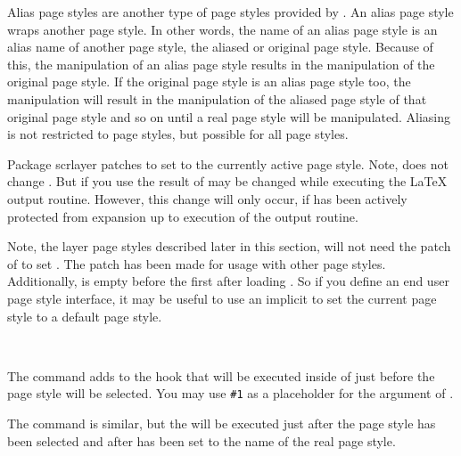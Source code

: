 Alias page styles are another type of page styles provided by
. An alias page style wraps another page style. In other
words, the name of an alias page style is an alias name of another page style,
the aliased or original page style. Because of this, the manipulation of an
alias page style results in the manipulation of the original page style. If
the original page style is an alias page style too, the manipulation will
result in the manipulation of the aliased page style of that original page
style and so on until a real page style will be manipulated. Aliasing is not
restricted to  page styles, but possible for all page
styles.

\begin{Declaration}
\end{Declaration}
%
Package scrlayer patches  to set  to
the currently active page style. Note,  does not change
. But if you use  the result of
 may be changed while executing the \LaTeX{} output
routine. However, this change will only occur, if  has
been actively protected from expansion up to execution of the output routine.

Note, the layer page styles described later in this section, will not need
the patch of  to set . The patch has
been made for usage with other page styles. Additionally, 
 is empty before the first  after
loading . So if you define an end user page style interface,
it may be useful to use an implicit  to set the current page
style to a default page style.%

\begin{Declaration}
  \\
\end{Declaration}
%
%
The command  adds  to the hook
that will be executed inside of  just before the page style
will be selected. You may use \texttt{\#1} as a placeholder for the argument
of .

The command  is similar, but the 
will be executed just after the page style has been selected and after
 has been set to the name of the real page style.

